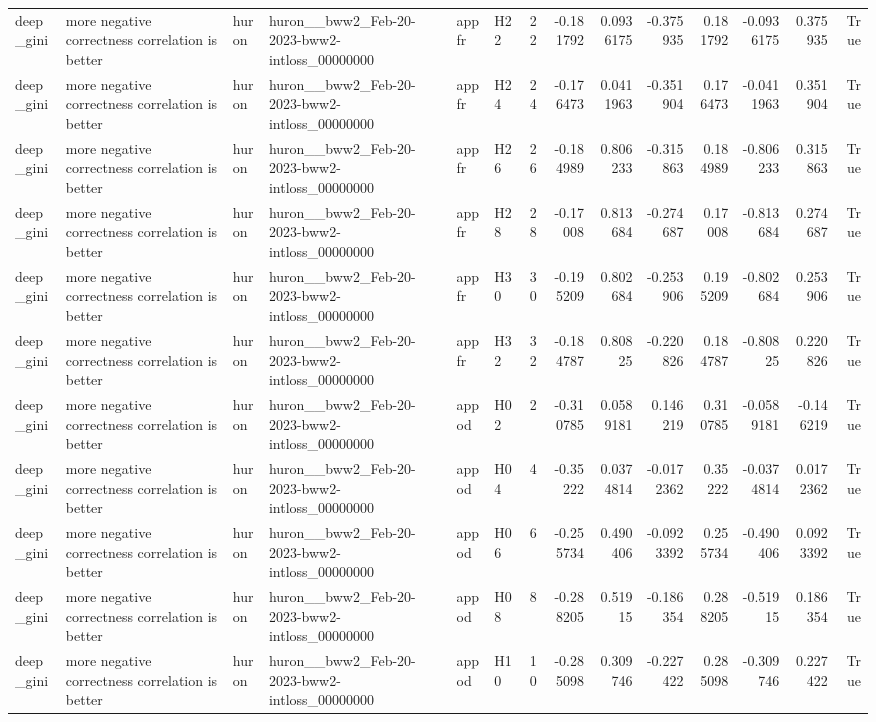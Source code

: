\begin{longtable}{llllllrrrrrrrr}
deep\_gini & more negative correctness correlation is better & huron & huron\_\_bww2\_Feb-20-2023-bww2-intloss\_00000000 & appfr & H22 & 22 & -0.181792 & 0.0936175 & -0.375935 & 0.181792 & -0.0936175 & 0.375935 & True \\
deep\_gini & more negative correctness correlation is better & huron & huron\_\_bww2\_Feb-20-2023-bww2-intloss\_00000000 & appfr & H24 & 24 & -0.176473 & 0.0411963 & -0.351904 & 0.176473 & -0.0411963 & 0.351904 & True \\
deep\_gini & more negative correctness correlation is better & huron & huron\_\_bww2\_Feb-20-2023-bww2-intloss\_00000000 & appfr & H26 & 26 & -0.184989 & 0.806233 & -0.315863 & 0.184989 & -0.806233 & 0.315863 & True \\
deep\_gini & more negative correctness correlation is better & huron & huron\_\_bww2\_Feb-20-2023-bww2-intloss\_00000000 & appfr & H28 & 28 & -0.17008 & 0.813684 & -0.274687 & 0.17008 & -0.813684 & 0.274687 & True \\
deep\_gini & more negative correctness correlation is better & huron & huron\_\_bww2\_Feb-20-2023-bww2-intloss\_00000000 & appfr & H30 & 30 & -0.195209 & 0.802684 & -0.253906 & 0.195209 & -0.802684 & 0.253906 & True \\
deep\_gini & more negative correctness correlation is better & huron & huron\_\_bww2\_Feb-20-2023-bww2-intloss\_00000000 & appfr & H32 & 32 & -0.184787 & 0.80825 & -0.220826 & 0.184787 & -0.80825 & 0.220826 & True \\
deep\_gini & more negative correctness correlation is better & huron & huron\_\_bww2\_Feb-20-2023-bww2-intloss\_00000000 & appod & H02 & 2 & -0.310785 & 0.0589181 & 0.146219 & 0.310785 & -0.0589181 & -0.146219 & True \\
deep\_gini & more negative correctness correlation is better & huron & huron\_\_bww2\_Feb-20-2023-bww2-intloss\_00000000 & appod & H04 & 4 & -0.35222 & 0.0374814 & -0.0172362 & 0.35222 & -0.0374814 & 0.0172362 & True \\
deep\_gini & more negative correctness correlation is better & huron & huron\_\_bww2\_Feb-20-2023-bww2-intloss\_00000000 & appod & H06 & 6 & -0.255734 & 0.490406 & -0.0923392 & 0.255734 & -0.490406 & 0.0923392 & True \\
deep\_gini & more negative correctness correlation is better & huron & huron\_\_bww2\_Feb-20-2023-bww2-intloss\_00000000 & appod & H08 & 8 & -0.288205 & 0.51915 & -0.186354 & 0.288205 & -0.51915 & 0.186354 & True \\
deep\_gini & more negative correctness correlation is better & huron & huron\_\_bww2\_Feb-20-2023-bww2-intloss\_00000000 & appod & H10 & 10 & -0.285098 & 0.309746 & -0.227422 & 0.285098 & -0.309746 & 0.227422 & True \\

\end{longtable}
